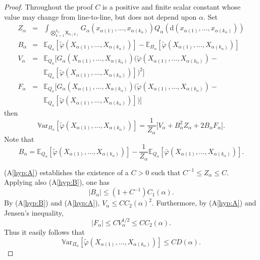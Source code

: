 \documentclass[english]{article}
\newcommand{\dif}{\mathrm{d}}
\begin{document}
\begin{proof}
Throughout the proof $C$ is a positive and finite scalar constant whose value may change from line-to-line, but does not depend upon $\alpha$.
Set 
\begin{eqnarray*}
Z_{\alpha} & = &
\int_{\bigotimes_{k=1}^{k_{\alpha}} \mathsf{X}_{\alpha(k)}} G_{\alpha}(x_{\alpha(1)},\dots,x_{\alpha(k_{\alpha})}) Q_\alpha(\dif (x_{\alpha(1)},\dots,x_{\alpha(k_{\alpha})})) \\
B_{\alpha} & = & \mathbb{E}_{Q_\alpha}[\tilde{\varphi}(X_{\alpha(1)},\dots,X_{\alpha(k_{\alpha})})]-
\mathbb{E}_{\Pi_{\alpha}}[\tilde{\varphi}(X_{\alpha(1)},\dots,X_{\alpha(k_{\alpha})})] \\
V_{\alpha} & = & \mathbb{E}_{Q_\alpha}[G_{\alpha}(X_{\alpha(1)},\dots,X_{\alpha(k_{\alpha})})
(\tilde{\varphi}(X_{\alpha(1)},\dots,X_{\alpha(k_{\alpha})}) - \\ & &
\mathbb{E}_{Q_\alpha}[\tilde{\varphi}(X_{\alpha(1)},\dots,X_{\alpha(k_{\alpha})})]
)^2]\\
F_{\alpha} & = & \mathbb{E}_{Q_\alpha}[G_{\alpha}(X_{\alpha(1)},\dots,X_{\alpha(k_{\alpha})})
(\tilde{\varphi}(X_{\alpha(1)},\dots,X_{\alpha(k_{\alpha})}) - \\ & &
\mathbb{E}_{Q_\alpha}[\tilde{\varphi}(X_{\alpha(1)},\dots,X_{\alpha(k_{\alpha})})]
)]
\end{eqnarray*}
then
$$
\mathbb{V}\textrm{ar}_{\Pi_{\alpha}}[\tilde{\varphi}(X_{\alpha(1)},\dots,X_{\alpha(k_{\alpha})})]
= \frac{1}{Z_{\alpha}}
\Big[V_{\alpha} + B_{\alpha}^2Z_{\alpha} + 2B_{\alpha}F_{\alpha}\Big].
$$
Note that
$$
B_{\alpha} = \mathbb{E}_{Q_\alpha}[\tilde{\varphi}(X_{\alpha(1)},\dots,X_{\alpha(k_{\alpha})})] -
\frac{1}{Z_{\alpha}}\mathbb{E}_{Q_\alpha}[\bar{\varphi}(X_{\alpha(1)},\dots,X_{\alpha(k_{\alpha})})].
$$
 
(A\ref{hyp:A}) establishes the existence of a $C>0$ such that 
$C^{-1} \leq Z_{\alpha}\leq C$.
Applying also (A\ref{hyp:B}), one has %
$$
|B_{\alpha}| \leq (1+C^{-1})C_{1}(\alpha).
$$
By (A\ref{hyp:B}) and (A\ref{hyp:A}),  
$V_{\alpha}\leq C C_{2}(\alpha)^2$. 
Furthermore, %
by (A\ref{hyp:A}) and Jensen's inequality,
$$|F_{\alpha}|\leq C V_\alpha^{1/2} \leq C C_{2}(\alpha).$$ 
Thus it easily follows that %
$$
\mathbb{V}\textrm{ar}_{\Pi_{\alpha}}[\tilde{\varphi}(X_{\alpha(1)},\dots,X_{\alpha(k_{\alpha})})]
\leq C D(\alpha).
$$
\end{proof}
\end{document}
